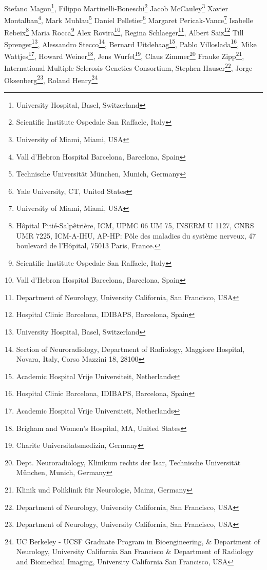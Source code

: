 Stefano Magon\footnote[6]{University Hospital, Basel, Switzerland},
Filippo Martinelli-Boneschi\footnote[13]{Scientific Institute Ospedale San Raffaele, Italy}
Jacob McCauley\footnote[19]{University of Miami, Miami, USA}
Xavier Montalban\footnote[9]{Vall d’Hebron Hospital Barcelona, Barcelona, Spain},
Mark Muhlau\footnote[17]{Technische Universität München, Munich, Germany}
Daniel Pelletier\footnote[16]{Yale University, CT, United States}
Margaret Pericak-Vance\footnote[19]{University of Miami, Miami, USA}
Isabelle Rebeix\footnote[14]{Hôpital Pitié-Salpêtrière, ICM, UPMC 06 UM 75, INSERM U 1127, CNRS UMR 7225, ICM-A-IHU, AP-HP:  
Pôle des maladies du système nerveux, 47 boulevard de l'Hôpital, 75013  
Paris, France.}
Maria Rocca\footnote[13]{Scientific Institute Ospedale San Raffaele, Italy}
Alex Rovira\footnote[9]{Vall d’Hebron Hospital Barcelona, Barcelona, Spain},
Regina Schlaeger\footnote[4]{Department of Neurology, University California, San Francisco,  USA},
Albert Saiz\footnote[18]{Hospital Clinic Barcelona, IDIBAPS, Barcelona, Spain}
Till Sprenger\footnote[6]{University Hospital, Basel, Switzerland},
Alessandro Stecco\footnote[20]{Section of Neuroradiology, Department of Radiology, Maggiore Hospital, Novara, Italy, Corso Mazzini 18, 28100},
Bernard Uitdehaag\footnote[21]{Academic Hospital Vrije Universiteit, Netherlands},
Pablo Villoslada\footnote[18]{Hospital Clinic Barcelona, IDIBAPS, Barcelona, Spain},
Mike Wattjes\footnote[21]{Academic Hospital Vrije Universiteit, Netherlands},
Howard Weiner\footnote[7]{Brigham and Women's Hospital, MA, United States},
Jens Wurfel\footnote[2]{Charite Universitatsmedizin, Germany},
Claus Zimmer\footnote[22]{Dept. Neuroradiology, Klinikum rechts der Isar, Technische Universität München, Munich, Germany}
Frauke Zipp\footnote[15]{Klinik und Poliklinik für Neurologie, Mainz, Germany},
International Multiple Sclerosis Genetics Consortium,
Stephen Hauser\footnote[4]{Department of Neurology, University California, San Francisco,  USA},
Jorge Oksenberg\footnote[4]{Department of Neurology, University California, San Francisco,  USA},
Roland Henry\footnote[1,4,10]{UC Berkeley - UCSF Graduate Program in Bioengineering,  & Department of Neurology, University California San Francisco & Department of Radiology and Biomedical Imaging, University California San Francisco, USA}

